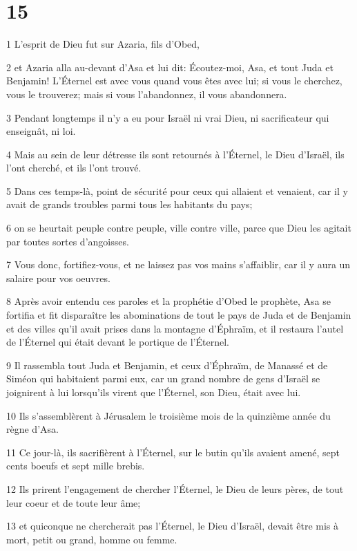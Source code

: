 \chapter{15}

\par 1 L'esprit de Dieu fut sur Azaria, fils d'Obed,
\par 2 et Azaria alla au-devant d'Asa et lui dit: Écoutez-moi, Asa, et tout Juda et Benjamin! L'Éternel est avec vous quand vous êtes avec lui; si vous le cherchez, vous le trouverez; mais si vous l'abandonnez, il vous abandonnera.
\par 3 Pendant longtemps il n'y a eu pour Israël ni vrai Dieu, ni sacrificateur qui enseignât, ni loi.
\par 4 Mais au sein de leur détresse ils sont retournés à l'Éternel, le Dieu d'Israël, ils l'ont cherché, et ils l'ont trouvé.
\par 5 Dans ces temps-là, point de sécurité pour ceux qui allaient et venaient, car il y avait de grands troubles parmi tous les habitants du pays;
\par 6 on se heurtait peuple contre peuple, ville contre ville, parce que Dieu les agitait par toutes sortes d'angoisses.
\par 7 Vous donc, fortifiez-vous, et ne laissez pas vos mains s'affaiblir, car il y aura un salaire pour vos oeuvres.
\par 8 Après avoir entendu ces paroles et la prophétie d'Obed le prophète, Asa se fortifia et fit disparaître les abominations de tout le pays de Juda et de Benjamin et des villes qu'il avait prises dans la montagne d'Éphraïm, et il restaura l'autel de l'Éternel qui était devant le portique de l'Éternel.
\par 9 Il rassembla tout Juda et Benjamin, et ceux d'Éphraïm, de Manassé et de Siméon qui habitaient parmi eux, car un grand nombre de gens d'Israël se joignirent à lui lorsqu'ils virent que l'Éternel, son Dieu, était avec lui.
\par 10 Ils s'assemblèrent à Jérusalem le troisième mois de la quinzième année du règne d'Asa.
\par 11 Ce jour-là, ils sacrifièrent à l'Éternel, sur le butin qu'ils avaient amené, sept cents boeufs et sept mille brebis.
\par 12 Ils prirent l'engagement de chercher l'Éternel, le Dieu de leurs pères, de tout leur coeur et de toute leur âme;
\par 13 et quiconque ne chercherait pas l'Éternel, le Dieu d'Israël, devait être mis à mort, petit ou grand, homme ou femme.
